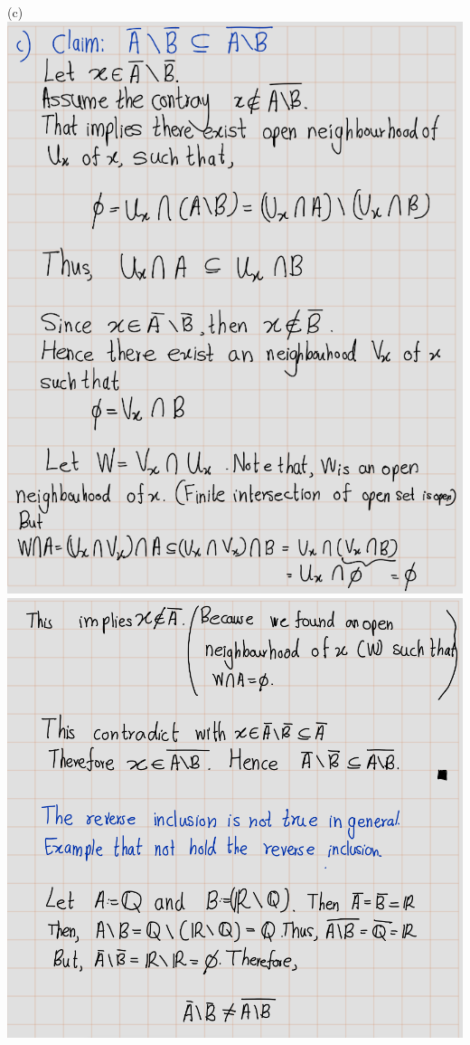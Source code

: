 \documentclass[
]{book}
\theoremstyle{definition}
\theoremstyle{definition}
\theoremstyle{definition}
\theoremstyle{definition}
\theoremstyle{remark}
\begin{document}
(c)\\
\includegraphics{figures/Exercises/Ex 2.17/ex-8-3.png}
\includegraphics{figures/Exercises/Ex 2.17/ex-8-4.png}
\end{document}
